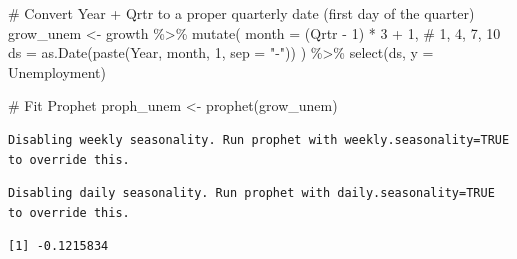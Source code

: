 \documentclass[
  letterpaper,
  DIV=11,
  numbers=noendperiod]{scrartcl}
\newenvironment{Shaded}{\begin{snugshade}}{\end{snugshade}}
\newcommand{\AttributeTok}[1]{\textcolor[rgb]{0.40,0.45,0.13}{#1}}
\newcommand{\CommentTok}[1]{\textcolor[rgb]{0.37,0.37,0.37}{#1}}
\newcommand{\DecValTok}[1]{\textcolor[rgb]{0.68,0.00,0.00}{#1}}
\newcommand{\FunctionTok}[1]{\textcolor[rgb]{0.28,0.35,0.67}{#1}}
\newcommand{\NormalTok}[1]{\textcolor[rgb]{0.00,0.23,0.31}{#1}}
\newcommand{\OtherTok}[1]{\textcolor[rgb]{0.00,0.23,0.31}{#1}}
\newcommand{\SpecialCharTok}[1]{\textcolor[rgb]{0.37,0.37,0.37}{#1}}
\newcommand{\StringTok}[1]{\textcolor[rgb]{0.13,0.47,0.30}{#1}}
\begin{document}
\begin{Shaded}
\begin{Highlighting}[]
\CommentTok{\# Convert Year + Qrtr to a proper quarterly date (first day of the quarter)}
\NormalTok{grow\_unem }\OtherTok{\textless{}{-}}\NormalTok{ growth }\SpecialCharTok{\%\textgreater{}\%}
  \FunctionTok{mutate}\NormalTok{(}
    \AttributeTok{month =}\NormalTok{ (Qrtr }\SpecialCharTok{{-}} \DecValTok{1}\NormalTok{) }\SpecialCharTok{*} \DecValTok{3} \SpecialCharTok{+} \DecValTok{1}\NormalTok{,                     }\CommentTok{\# 1, 4, 7, 10}
    \AttributeTok{ds =} \FunctionTok{as.Date}\NormalTok{(}\FunctionTok{paste}\NormalTok{(Year, month, }\DecValTok{1}\NormalTok{, }\AttributeTok{sep =} \StringTok{"{-}"}\NormalTok{))}
\NormalTok{  ) }\SpecialCharTok{\%\textgreater{}\%}
  \FunctionTok{select}\NormalTok{(ds, }\AttributeTok{y =}\NormalTok{ Unemployment)}

\CommentTok{\# Fit Prophet}
\NormalTok{proph\_unem }\OtherTok{\textless{}{-}} \FunctionTok{prophet}\NormalTok{(grow\_unem)}
\end{Highlighting}
\end{Shaded}

\begin{verbatim}
Disabling weekly seasonality. Run prophet with weekly.seasonality=TRUE to override this.
\end{verbatim}

\begin{verbatim}
Disabling daily seasonality. Run prophet with daily.seasonality=TRUE to override this.
\end{verbatim}

\begin{Shaded}
\end{Shaded}

\begin{verbatim}
[1] -0.1215834
\end{verbatim}
\end{document}

